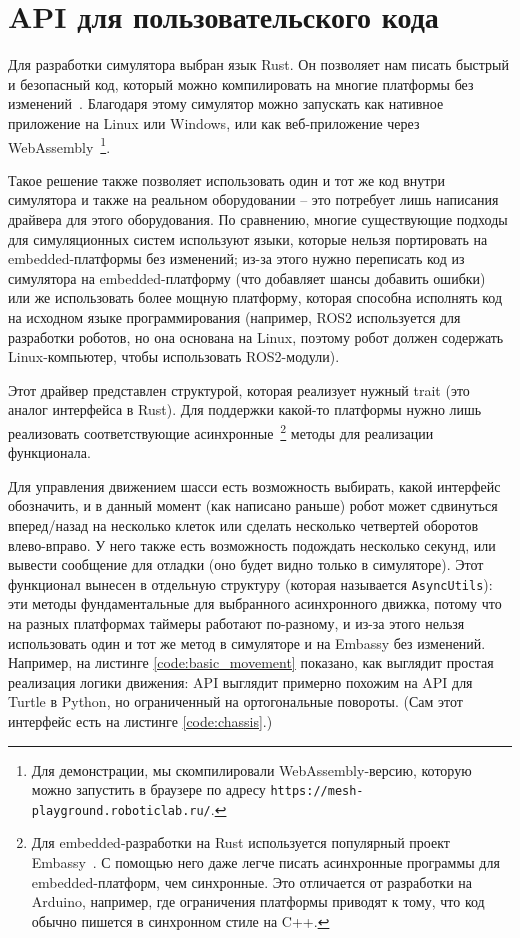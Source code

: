 \documentclass[%
]{report}
\begin{document}
\section{API для пользовательского кода}

Для разработки симулятора выбран язык Rust.
Он позволяет нам писать быстрый и безопасный код,
который можно компилировать на многие платформы без изменений~\cite{10.1145/2663171.2663188,klabnik2022rust}.
Благодаря этому симулятор можно запускать как нативное приложение на Linux или Windows,
или как веб-приложение через WebAssembly~\footnote{Для демонстрации,
мы скомпилировали WebAssembly-версию, которую можно запустить в браузере по адресу \texttt{https://mesh-playground.roboticlab.ru/}.}.

Такое решение также позволяет использовать один и тот же код внутри симулятора
и также на реальном оборудовании --
это потребует лишь написания драйвера для этого оборудования.
По сравнению, многие существующие подходы
для симуляционных систем
используют языки,
которые нельзя портировать на embedded-платформы без изменений;
из-за этого нужно переписать код из симулятора на embedded-платформу
(что добавляет шансы добавить ошибки)
или же использовать более мощную платформу, которая способна
исполнять код на исходном языке программирования
(например, ROS2 используется для разработки роботов,
но она основана на Linux, поэтому робот должен содержать
Linux-компьютер, чтобы использовать ROS2-модули).

Этот драйвер представлен структурой, которая реализует нужный trait (это аналог интерфейса в Rust).
Для поддержки какой-то платформы нужно лишь реализовать соответствующие асинхронные~\footnote{Для embedded-разработки
на Rust используется популярный проект Embassy~\cite{embassy}. С помощью него даже легче писать асинхронные программы
для embedded-платформ, чем синхронные. Это отличается от разработки на Arduino, например,
где ограничения платформы приводят к тому,
что код обычно пишется в синхронном стиле на C++.}
 методы для реализации функционала.

Для управления движением шасси есть возможность выбирать, какой интерфейс обозначить,
и в данный момент (как написано раньше)
робот может сдвинуться вперед/назад на несколько клеток или сделать несколько четвертей оборотов
влево-вправо.
У него также есть возможность подождать несколько секунд,
или вывести сообщение для отладки
(оно будет видно только в симуляторе).
Этот функционал вынесен в отдельную структуру
(которая называется \texttt{AsyncUtils}):
эти методы фундаментальные для выбранного асинхронного движка,
потому что на разных платформах таймеры работают по-разному,
и из-за этого нельзя использовать один и тот же метод 
в симуляторе и на Embassy без изменений.
Например, на листинге \ref{code:basic_movement} показано,
как выглядит простая реализация логики движения:
API выглядит примерно похожим на API для Turtle в Python,
но ограниченный на ортогональные повороты.
(Сам этот интерфейс есть на листинге \ref{code:chassis}.)
\end{document}
